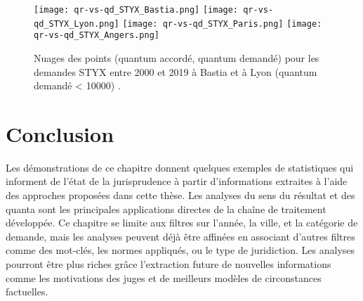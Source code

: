 \begin{figure}[!htb]
	\centering 
	\texttt{[image: qr-vs-qd\_STYX\_Bastia.png]}
	\texttt{[image: qr-vs-qd\_STYX\_Lyon.png]}
	\texttt{[image: qr-vs-qd\_STYX\_Paris.png]}
	\texttt{[image: qr-vs-qd\_STYX\_Angers.png]}
	\caption{Nuages des points (quantum accordé, quantum demandé) pour les demandes STYX entre 2000 et 2019 à Bastia et à Lyon (quantum demandé < 10000) .}\label{fig:demo:qr-vs-qd-styx-compare-ville}
\end{figure}

\section{Conclusion}
\label{sec:demo:conclusion}
Les démonstrations de ce chapitre donnent quelques exemples de statistiques qui informent de l'état de la jurisprudence à partir d'informations extraites à l'aide des approches proposées dans cette thèse. Les analyses du sens du résultat et des quanta sont les principales applications directes de la chaîne de traitement développée. Ce chapitre se limite aux filtres sur l'année, la ville, et la catégorie de demande, mais les analyses peuvent déjà être affinées en associant d'autres filtres comme  des mot-clés,  les normes appliqués, ou le type de juridiction. Les analyses pourront être plus riches grâce l'extraction future de nouvelles informations comme les motivations des juges et de meilleurs modèles de circonstances factuelles.